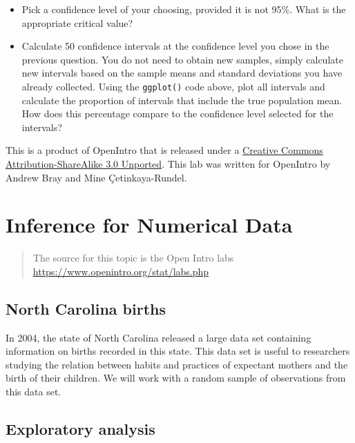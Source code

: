 \documentclass[]{book}
\theoremstyle{definition}
\theoremstyle{definition}
\theoremstyle{remark}
\begin{document}
\begin{itemize}
\item
  Pick a confidence level of your choosing, provided it is not 95\%.
  What is the appropriate critical value?
\item
  Calculate 50 confidence intervals at the confidence level you chose in
  the previous question. You do not need to obtain new samples, simply
  calculate new intervals based on the sample means and standard
  deviations you have already collected. Using the \texttt{ggplot()}
  code above, plot all intervals and calculate the proportion of
  intervals that include the true population mean. How does this
  percentage compare to the confidence level selected for the intervals?
\end{itemize}

\hypertarget{license}{}
This is a product of OpenIntro that is released under a
\href{http://creativecommons.org/licenses/by-sa/3.0}{Creative Commons
Attribution-ShareAlike 3.0 Unported}. This lab was written for OpenIntro
by Andrew Bray and Mine Çetinkaya-Rundel.

\hypertarget{inference-numerical}{\chapter*{Inference for Numerical
Data}\label{inference-numerical}}

\begin{quote}
The source for this topic is the Open Intro labs
\url{https://www.openintro.org/stat/labs.php}
\end{quote}

\section*{North Carolina births}\label{north-carolina-births}

In 2004, the state of North Carolina released a large data set
containing information on births recorded in this state. This data set
is useful to researchers studying the relation between habits and
practices of expectant mothers and the birth of their children. We will
work with a random sample of observations from this data set.

\section*{Exploratory analysis}\label{exploratory-analysis}
\end{document}
